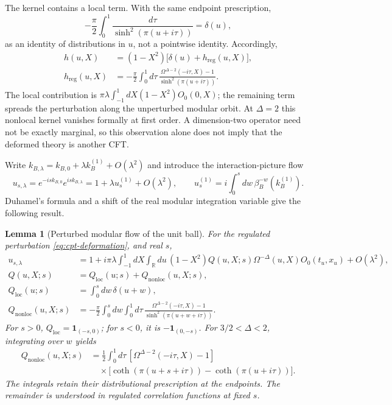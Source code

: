 \documentclass[a4paper,11pt]{article}
\newtheorem{lemma}[theorem]{Lemma}
\theoremstyle{definition}
\begin{document}
The kernel contains a local term. With the same endpoint prescription,
\begin{equation}
 -\frac{\pi}{2}\int_0^1\frac{d\tau}{\sinh^2(\pi(u+i\tau))}=\delta(u),
 \label{eq:cpt-delta-kernel}
\end{equation}
as an identity of distributions in $u$, not a pointwise identity. Accordingly,
\begin{align}
 h(u,X)&=(1-X^2)\bigl[\delta(u)+h_{\mathrm{reg}}(u,X)\bigr],\nonumber\\
 h_{\mathrm{reg}}(u,X)&=-\frac{\pi}{2}\int_0^1d\tau\,
 \frac{\Omega^{\Delta-2}(-i\tau,X)-1}{\sinh^2(\pi(u+i\tau))}.
 \label{eq:cpt-regular-kernel}
\end{align}
The local contribution is $\pi\lambda\int_{-1}^1dX(1-X^2)O_0(0,X)$; the remaining term spreads the perturbation along the unperturbed modular orbit. At $\Delta=2$ this nonlocal kernel vanishes formally at first order. A dimension-two operator need not be exactly marginal, so this observation alone does not imply that the deformed theory is another CFT.

Write $k_{B,\lambda}=k_{B,0}+\lambda k_B^{(1)}+O(\lambda^2)$ and introduce the interaction-picture flow
\begin{equation}
 u_{s,\lambda}=e^{-is k_{B,0}}e^{is k_{B,\lambda}}
 =1+\lambda u_s^{(1)}+O(\lambda^2),
 \qquad u_s^{(1)}=i\int_0^s dw\,\beta_B^{-w}(k_B^{(1)}).
 \label{eq:cpt-interaction-flow}
\end{equation}
Duhamel's formula and a shift of the real modular integration variable give the following result.
\begin{lemma}[Perturbed modular flow of the unit ball]
\label{lem:cpt-ball-flow}
For the regulated perturbation \eqref{eq:cpt-deformation}, and real $s$,
\begin{align}
 u_{s,\lambda}&=1+i\pi\lambda\int_{-1}^1dX\int_{\mathbb R}du\,
 (1-X^2)Q(u,X;s)\Omega^{-\Delta}(u,X)O_0(t_u,x_u)
 +O(\lambda^2),\label{eq:cpt-flow-correction}\\
 Q(u,X;s)&=Q_{\mathrm{loc}}(u;s)+Q_{\mathrm{nonloc}}(u,X;s),\nonumber\\
 Q_{\mathrm{loc}}(u;s)&=\int_0^s dw\,\delta(u+w),\nonumber\\
 Q_{\mathrm{nonloc}}(u,X;s)&=-\frac{\pi}{2}\int_0^s dw\int_0^1d\tau\,
 \frac{\Omega^{\Delta-2}(-i\tau,X)-1}{\sinh^2(\pi(u+w+i\tau))}.
 \label{eq:cpt-Q-kernel}
\end{align}
For $s>0$, $Q_{\mathrm{loc}}=\mathbf 1_{(-s,0)}$; for $s<0$, it is $-\mathbf 1_{(0,-s)}$. For $3/2<\Delta<2$, integrating over $w$ yields
\begin{align}
 Q_{\mathrm{nonloc}}(u,X;s)
 &=\frac12\int_0^1d\tau\,[\Omega^{\Delta-2}(-i\tau,X)-1]\nonumber\\
 &\quad\times\bigl[\coth(\pi(u+s+i\tau))-\coth(\pi(u+i\tau))\bigr].
 \label{eq:cpt-Q-coth}
\end{align}
The integrals retain their distributional prescription at the endpoints. The remainder is understood in regulated correlation functions at fixed $s$.
\end{lemma}
\end{document}
